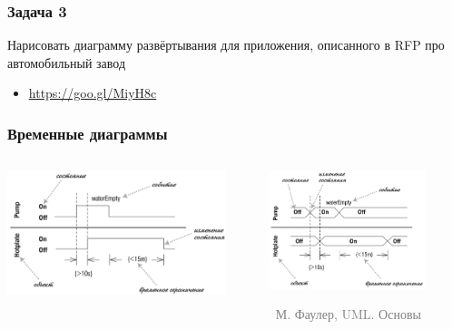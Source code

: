 \documentclass[xetex,mathserif,serif]{beamer}
\newcommand{\attribution}[1] {
	\vspace{-5mm}\begin{flushright}\begin{scriptsize}\textcolor{gray}{\textcopyright\, #1}\end{scriptsize}\end{flushright}
}
\begin{document}
	\begin{frame}
		\frametitle{Задача 3}
		Нарисовать диаграмму развёртывания для приложения, описанного в RFP про автомобильный завод
		\begin{itemize}
			\item \url{https://goo.gl/MiyH8c}
		\end{itemize}
	\end{frame}

	\begin{frame}
		\frametitle{Временные диаграммы}
		\begin{columns}
			\begin{column}{0.5\textwidth}
				\begin{center}
					\includegraphics[width=0.9\textwidth]{timingDiagrams.png}
				\end{center}
			\end{column}
			\begin{column}{0.5\textwidth}
				\begin{center}
					\includegraphics[width=0.8\textwidth]{timingDiagramsAlternate.png}
					\attribution{М. Фаулер, UML. Основы}
				\end{center}
			\end{column}
		\end{columns}
	\end{frame}
\end{document}
